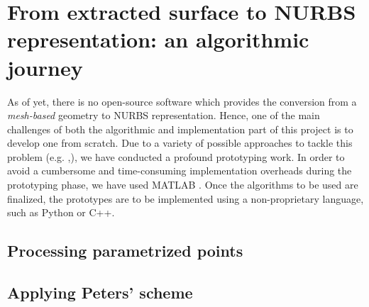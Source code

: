 \section{From extracted surface to NURBS representation: an algorithmic journey}
As of yet, there is no open-source software which provides the conversion from a \textit{mesh-based} geometry to NURBS representation. Hence, one of the main challenges of both the algorithmic and implementation part of this project is to develop one from scratch. Due to a variety of possible approaches to tackle this problem (e.g. \cite{becker2011advanced},\cite{eck1996automatic}), we have conducted a profound prototyping work. In order to avoid a cumbersome and time-consuming implementation overheads during the prototyping phase, we have used MATLAB \cite{MATLAB}. Once the algorithms to be used are finalized, the prototypes are to be implemented using a non-proprietary language, such as Python or C++.

\subsection{Processing parametrized points}
\subsection{Applying Peters' scheme}



